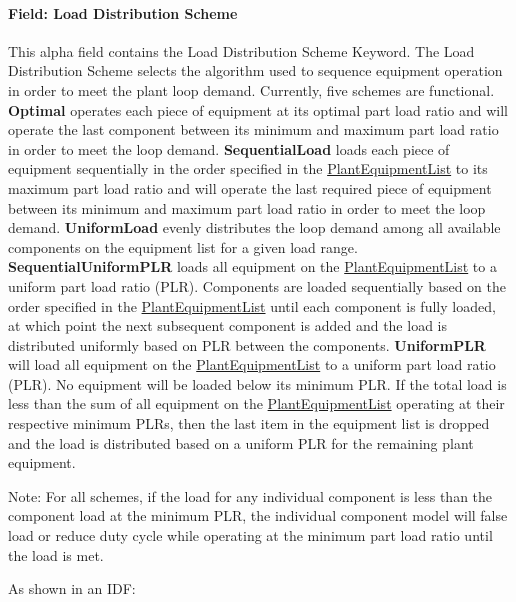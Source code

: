 \paragraph{Field: Load Distribution Scheme}\label{field-load-distribution-scheme}

This alpha field contains the Load Distribution Scheme Keyword. The Load Distribution Scheme selects the algorithm used to sequence equipment operation in order to meet the plant loop demand. Currently, five schemes are functional. \textbf{Optimal} operates each piece of equipment at its optimal part load ratio and will operate the last component between its minimum and maximum part load ratio in order to meet the loop demand. \textbf{SequentialLoad} loads each piece of equipment sequentially in the order specified in the \hyperref[plantequipmentlist]{PlantEquipmentList} to its maximum part load ratio and will operate the last required piece of equipment between its minimum and maximum part load ratio in order to meet the loop demand. \textbf{UniformLoad} evenly distributes the loop demand among all available components on the equipment list for a given load range. \textbf{SequentialUniformPLR} loads all equipment on the \hyperref[plantequipmentlist]{PlantEquipmentList} to a uniform part load ratio (PLR). Components are loaded sequentially based on the order specified in the \hyperref[plantequipmentlist]{PlantEquipmentList} until each component is fully loaded, at which point the next subsequent component is added and the load is distributed uniformly based on PLR between the components. \textbf{UniformPLR} will load all equipment on the \hyperref[plantequipmentlist]{PlantEquipmentList} to a uniform part load ratio (PLR). No equipment will be loaded below its minimum PLR. If the total load is less than the sum of all equipment on the \hyperref[plantequipmentlist]{PlantEquipmentList} operating at their respective minimum PLRs, then the last item in the equipment list is dropped and the load is distributed based on a uniform PLR for the remaining plant equipment.

Note: For all schemes, if the load for any individual component is less than the component load at the minimum PLR, the individual component model will false load or reduce duty cycle while operating at the minimum part load ratio until the load is met.

As shown in an IDF:


